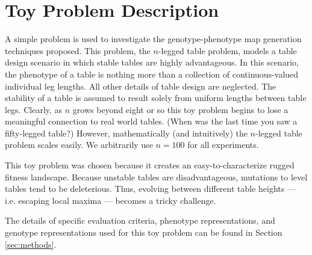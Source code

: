 \section{Toy Problem Description} \label{sec:problem-description}

A simple problem is used to investigate the genotype-phenotype map generation techniques proposed.
This problem, the $n$-legged table problem, models a table design scenario
in which stable tables are highly advantageous.
In this scenario, the phenotype of a table is nothing more than a collection of continuous-valued individual leg lengths.
All other details of table design are neglected.
The stability of a table is assumed to result solely from uniform lengths between table legs.
Clearly, as $n$ grows beyond eight or so this toy problem begins to lose a meaningful connection to real world tables.
(When was the last time you saw a fifty-legged table?)
However, mathematically (and intuitively) the $n$-legged table problem scales easily.
We arbitrarily use $n=100$ for all experiments.

This toy problem was chosen because it creates an easy-to-characterize rugged fitness landscape.
Because unstable tables are disadvantageous, mutations to level tables tend to be deleterious.
Thus, evolving between different table heights --- i.e. escaping local maxima --- becomes a tricky challenge.

The details of specific evaluation criteria, phenotype representations, and genotype representations used for this toy problem can be found in Section \ref{sec:methods}.
